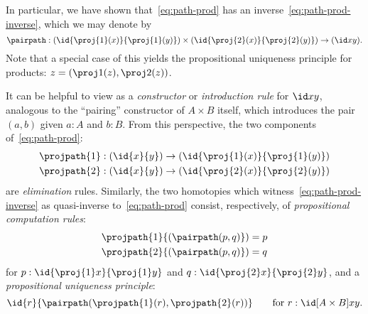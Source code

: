 In particular, we have shown that~\eqref{eq:path-prod} has an inverse~\eqref{eq:path-prod-inverse}, which we may denote by
\[
\pairpath : (\id{\proj{1}(x)}{\proj{1}(y)}) \times (\id{\proj{2}(x)}{\proj{2}(y)}) \to (\id x y).
\]
Note that a special case of this yields the propositional uniqueness principle for products: $z = (\proj1(z),\proj2(z))$.

It can be helpful to view \pairpath as a \emph{constructor} or \emph{introduction rule} for $\id x y$, analogous to the ``pairing'' constructor of $A\times B$ itself, which introduces the pair $(a,b)$ given $a:A$ and $b:B$.
From this perspective, the two components of~\eqref{eq:path-prod}:
\begin{align*}
  \projpath{1} &: (\id{x}{y}) \to (\id{\proj{1}(x)}{\proj{1} (y)})\\
  \projpath{2} &: (\id{x}{y}) \to (\id{\proj{2}(x)}{\proj{2} (y)})
\end{align*}
are \emph{elimination} rules.
Similarly, the two homotopies which witness~\eqref{eq:path-prod-inverse} as quasi-inverse to~\eqref{eq:path-prod} consist, respectively, of \emph{propositional computation rules}:
%
\begin{align*}
  {\projpath{1}{(\pairpath(p, q)})}
  &= %
  {p} \\
  {\projpath{2}{(\pairpath(p,q)})}
  &= %
  {q}
\end{align*}
for $p:\id{\proj{1} x}{\proj{1} y}$ and $q:\id{\proj{2} x}{\proj{2} y}$,
and a \emph{propositional uniqueness principle}:
%
\[
\id{r}{\pairpath(\projpath{1} (r), \projpath{2} (r)) }
\qquad\text{for } r : \id[A \times B] x y.
\]

